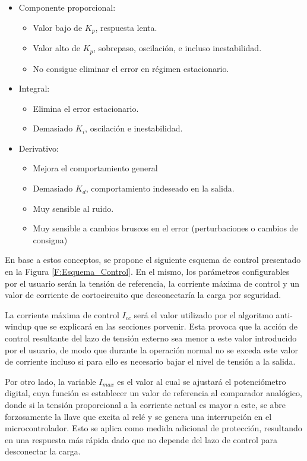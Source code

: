 \begin{itemize}
\item Componente proporcional:
\begin{itemize}
\item Valor bajo de $K_p$, respuesta lenta.
\item Valor alto de $K_p$, sobrepaso, oscilación, e incluso inestabilidad.
\item No consigue eliminar el error en régimen estacionario.
\end{itemize}
\item Integral:
\begin{itemize}
\item Elimina el error estacionario.
\item Demasiado $K_i$, oscilación e inestabilidad.
\end{itemize}
\item Derivativo:
\begin{itemize}
\item Mejora el comportamiento general
\item Demasiado $K_d$, comportamiento indeseado en la salida.
\item Muy sensible al ruido.
\item Muy sensible a cambios bruscos en el error (perturbaciones o cambios de consigna)
\end{itemize}
\end{itemize}\par 

En base a estos conceptos, se propone el siguiente esquema de control presentado en la Figura \ref{F:Esquema_Control}. En el mismo, los parámetros configurables por el usuario serán la tensión de referencia, la corriente máxima de control y un valor de corriente de cortocircuito que desconectaría la carga por seguridad. \par 
La corriente máxima de control $I_{cc}$ será el valor utilizado por el algoritmo anti-windup que se explicará en las secciones porvenir. Esta provoca que la acción de control resultante del lazo de tensión externo sea menor a este valor introducido por el usuario, de modo que durante la operación normal no se exceda este valor de corriente incluso si para ello es necesario bajar el nivel de tensión a la salida. \par 
Por otro lado, la variable $I_{max}$ es el valor al cual se ajustará el potenciómetro digital, cuya función es establecer un valor de referencia al comparador analógico, donde si la tensión proporcional a la corriente actual es mayor a este, se abre forzosamente la llave que excita al relé y se genera una interrupción en el microcontrolador. Esto se aplica como medida adicional de protección, resultando en una respuesta más rápida dado que no depende del lazo de control para desconectar la carga.\par 

